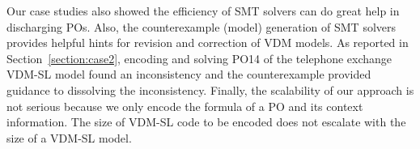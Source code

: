 Our case studies also showed the efficiency of SMT solvers can do great help in discharging POs. Also, the counterexample (model) generation of SMT solvers provides helpful hints for revision and correction of VDM models. As reported in Section~\ref{section:case2}, encoding and solving PO14 of the telephone exchange VDM-SL model found an inconsistency and the counterexample provided guidance to dissolving the inconsistency. Finally, the scalability of our approach is not serious because we only encode the formula of a PO and its context information. The size of VDM-SL code to be encoded does not escalate with the size of a VDM-SL model.



